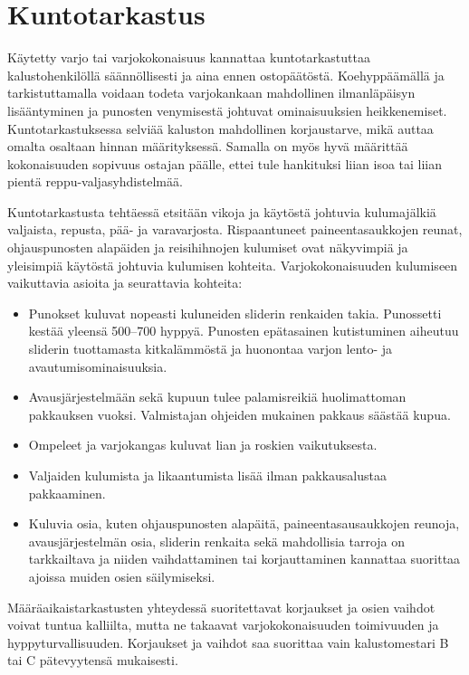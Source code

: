 \section{ Kuntotarkastus }
\label{kaluston-tarkastus-ja-huolto-kuntotarkastus}


Käytetty varjo tai varjokokonaisuus kannattaa kuntotarkastuttaa kalustohenkilöllä säännöllisesti ja aina ennen ostopäätöstä. Koehyppäämällä ja tarkistuttamalla voidaan todeta varjokankaan mahdollinen ilmanläpäisyn lisääntyminen ja punosten venymisestä johtuvat ominaisuuksien heikkenemiset. Kuntotarkastuksessa selviää kaluston mahdollinen korjaustarve, mikä auttaa omalta osaltaan hinnan määrityksessä. Samalla on myös hyvä määrittää kokonaisuuden sopivuus ostajan päälle, ettei tule hankituksi liian isoa tai liian pientä reppu-valjasyhdistelmää. 


Kuntotarkastusta tehtäessä etsitään vikoja ja käytöstä johtuvia kulumajälkiä valjaista, repusta, pää- ja varavarjosta. Rispaantuneet paineentasaukkojen reunat, ohjauspunosten alapäiden ja reisihihnojen kulumiset ovat näkyvimpiä ja yleisimpiä käytöstä johtuvia kulumisen kohteita. Varjokokonaisuuden kulumiseen vaikuttavia asioita ja seurattavia kohteita: 

\begin{itemize}
\item  Punokset kuluvat nopeasti kuluneiden sliderin renkaiden takia. Punossetti kestää yleensä 500–700 hyppyä. Punosten epätasainen kutistuminen aiheutuu sliderin tuottamasta kitkalämmöstä ja huonontaa varjon lento- ja avautumisominaisuuksia. 
\item  Avausjärjestelmään sekä kupuun tulee palamisreikiä huolimattoman pakkauksen vuoksi. Valmistajan ohjeiden mukainen pakkaus säästää kupua. 
\item  Ompeleet ja varjokangas kuluvat lian ja roskien vaikutuksesta. 
\item  Valjaiden kulumista ja likaantumista lisää ilman pakkausalustaa pakkaaminen. 
\item  Kuluvia osia, kuten ohjauspunosten alapäitä, paineentasausaukkojen reunoja, avausjärjestelmän osia, sliderin renkaita sekä mahdollisia tarroja on tarkkailtava ja niiden vaihdattaminen tai korjauttaminen kannattaa suorittaa ajoissa muiden osien säilymiseksi. 
\end{itemize}

Määräaikaistarkastusten yhteydessä suoritettavat korjaukset ja osien vaihdot voivat tuntua kalliilta, mutta ne takaavat varjokokonaisuuden toimivuuden ja hyppyturvallisuuden. Korjaukset ja vaihdot saa suorittaa vain kalustomestari B tai C pätevyytensä mukaisesti. 

